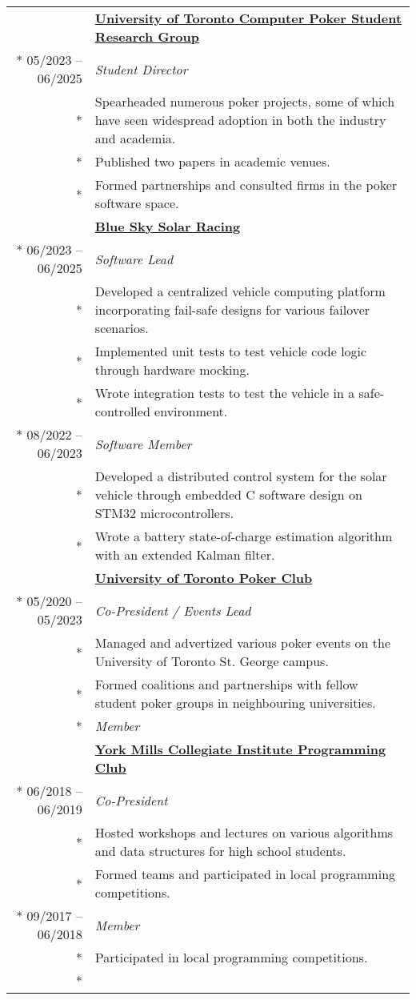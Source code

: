 \documentclass{article}
\begin{document}
	\begin{tabularx}{\textwidth}{r X}
		& \textbf{\href{https://uoftcprg.com/}{University of Toronto Computer Poker Student Research Group}} \\*
		05/2023 -- 06/2025 & \textit{Student Director} \\*
		& {\small Spearheaded numerous poker projects, some of which have seen widespread adoption in both the industry and academia.} \\*
		& {\small Published two papers in academic venues.} \\*
		& {\small Formed partnerships and consulted firms in the poker software space.} \\
		\addlinespace
		& \textbf{\href{https://www.blueskysolar.org/}{Blue Sky Solar Racing}} \\*
		06/2023 -- 06/2025 & \textit{Software Lead} \\*
		& {\small Developed a centralized vehicle computing platform incorporating fail-safe designs for various failover scenarios.} \\*
		& {\small Implemented unit tests to test vehicle code logic through hardware mocking.} \\*
		& {\small Wrote integration tests to test the vehicle in a safe-controlled environment.} \\*
		08/2022 -- 06/2023 & \textit{Software Member} \\*
		& {\small Developed a distributed control system for the solar vehicle through embedded C software design on STM32 microcontrollers.} \\*
		& {\small Wrote a battery state-of-charge estimation algorithm with an extended Kalman filter.} \\
		\addlinespace
		& \textbf{\href{https://uoftpoker.com/}{University of Toronto Poker Club}} \\*
		05/2020 -- 05/2023 & \textit{Co-President / Events Lead} \\*
		& {\small Managed and advertized various poker events on the University of Toronto St. George campus.} \\*
		& {\small Formed coalitions and partnerships with fellow student poker groups in neighbouring universities.} \\*
		\iftoggle{verbose}{
			09/2019 -- 05/2020 & \textit{Member} \\
			\addlinespace
			& \textbf{\href{https://schoolweb.tdsb.on.ca/yorkmillsci/Departments/Computer-Science/Clubs}{York Mills Collegiate Institute Programming Club}} \\*
			06/2018 -- 06/2019 & \textit{Co-President} \\*
			& {\small Hosted workshops and lectures on various algorithms and data structures for high school students.} \\*
			& {\small Formed teams and participated in local programming competitions.} \\*
			09/2017 -- 06/2018 & \textit{Member} \\*
			& {\small Participated in local programming competitions.} \\*
		}{}
	\end{tabularx}
\end{document}
